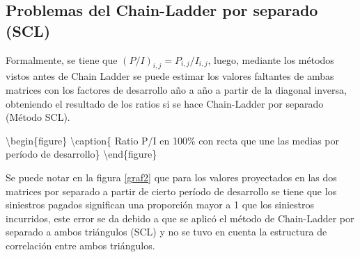 \documentclass[
  12pt,
]{article}
\begin{document}
\hypertarget{problemas-del-chain-ladder-por-separado-scl}{%
\subsection{Problemas del Chain-Ladder por separado
(SCL)}\label{problemas-del-chain-ladder-por-separado-scl}}

Formalmente, se tiene que \((P/I)_{i,j} = P_{i,j}/I_{i,j}\), luego,
mediante los métodos vistos antes de Chain Ladder se puede estimar los
valores faltantes de ambas matrices con los factores de desarrollo año a
año a partir de la diagonal inversa, obteniendo el resultado de los
ratios si se hace Chain-Ladder por separado (Método SCL).

\textbackslash begin\{figure\}
\textbackslash caption\{\label{graficos}
Ratio P/I en 100\% con recta que une las medias por período de
desarrollo\}\label{fig:unnamed-chunk-23} \textbackslash end\{figure\}

Se puede notar en la figura \ref{graf2} que para los valores proyectados
en las dos matrices por separado a partir de cierto período de
desarrollo se tiene que los siniestros pagados significan una proporción
mayor a 1 que los siniestros incurridos, este error se da debido a que
se aplicó el método de Chain-Ladder por separado a ambos triángulos
(SCL) y no se tuvo en cuenta la estructura de correlación entre ambos
triángulos.
\end{document}

